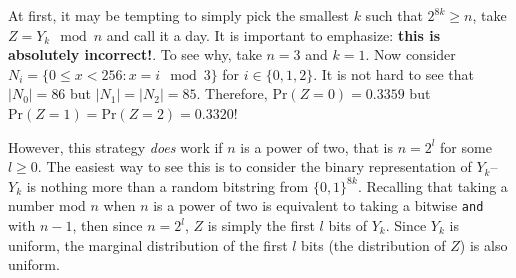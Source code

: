 \documentclass[10pt]{article}
\newcommand{\abs}[1]{\left| #1 \right|}
\renewcommand{\Pr}{\mathrm{Pr}}
\begin{document}
At first, it may be tempting to simply pick the smallest $k$ such that $2^{8k}
\geq n$, take $Z = Y_k \mod{n}$ and call it a day. It is
important to emphasize: \textbf{this is absolutely incorrect!}.
%
To see why, take $n=3$ and $k=1$. Now consider $N_i = \{ 0 \leq x < 256 : x = i \mod{3}
\}$ for $i \in \{0,1,2\}$. It is not hard to see that $\abs{N_0} = 86$ but
$\abs{N_1}=\abs{N_2} = 85$. Therefore, $\Pr(Z=0) = 0.3359$ but
$\Pr(Z=1)=\Pr(Z=2)=0.3320$!

However, this strategy \emph{does} work if $n$ is a power of two, that is
$n=2^l$ for some $l \geq 0$. The easiest way to see this is to consider the
binary representation of $Y_k$-- $Y_k$ is nothing more than a random bitstring
from $\{0,1\}^{8k}$. Recalling that taking a number mod $n$ when $n$ is a power
of two is equivalent to taking a bitwise \verb|and| with $n-1$, then since
$n=2^{l}$, $Z$ is simply the first $l$ bits of $Y_k$. Since $Y_k$ is uniform,
the marginal distribution of the first $l$ bits (the distribution of $Z$) is
also uniform.
\end{document}
